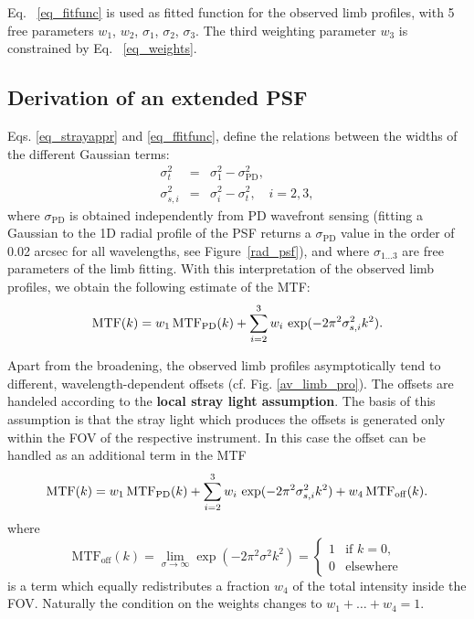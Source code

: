 \documentclass[goettingen, gauss, print]{thesis}
\begin{document}
Eq.~ \ref{eq_fitfunc} is used as fitted function for the observed limb profiles, with 5 free parameters $w_{1}$, $w_{2}$, $\sigma_{1}$, $\sigma_{2}$, $\sigma_{3}$. The third weighting parameter $w_3$ is constrained by Eq.~ \ref{eq_weights}. 

\subsection{Derivation of an extended PSF}

Eqs. \ref{eq_strayappr} and \ref{eq_ffitfunc}, define the relations between the widths of the different Gaussian terms:
\begin{eqnarray}
\sigma_{t}^{2} & = & \sigma_{1}^{2} - \sigma_{\mathrm{PD}}^2 \nonumber, \\
\sigma_{s,i}^{2} & = & \sigma_{i}^{2} - \sigma_{t}^{2}, \quad i=2,3,
\label{sigmas}
\end{eqnarray} 
where $\sigma_{\mathrm{PD}}$ is obtained independently from PD wavefront sensing (fitting a Gaussian to the 1D radial profile of the PSF returns a $\sigma_{\mathrm{PD}}$ value in the order of 0.02 arcsec for all wavelengths, see Figure~\ref{rad_psf}), and where $\sigma_{1\ldots3}$ are free parameters of the limb fitting. %
With this interpretation of the observed limb profiles, we obtain the following estimate of the MTF:
\begin{equation}
  \mathrm{MTF}(k) = w_{1} \, \mathrm{MTF}_{\mathrm{PD}}(k) + \sum_{i=2}^{3} w_{i} \, \exp(-2 \pi^2
  \sigma_{s,i}^2 k^2).
  \label{eq_mtf_stray}
\end{equation}

Apart from the broadening, the observed limb profiles asymptotically tend to different, wavelength-dependent offsets (cf. Fig. \ref{av_limb_pro}). The offsets are handeled according to the \textbf{local stray light assumption}. 
The basis of this assumption is that the stray light which produces the offsets is generated only within the FOV of the respective instrument. In this case the offset can be handled as an additional term in the MTF
\begin{equation}
  \mathrm{MTF}(k) = w_{1} \, \mathrm{MTF}_{\mathrm{PD}}(k) + \sum_{i=2}^{3} w_{i} \, \exp(-2 \pi^2
  \sigma_{s,i}^2 k^2) + w_{4} \, \mathrm{MTF}_{\mathrm{off}}(k).
\end{equation}  
where 
\begin{equation}
  \mathrm{MTF}_{\mathrm{off}}(k) = \lim_{\sigma \to \infty} \exp(-2 \pi^2
  \sigma^2 k^2) = \left\{
  \begin{array}{rl}
    1 & \textrm{if } k = 0,\\
    0 & \textrm{elsewhere}
  \end{array} \right.
\end{equation}
is a term which equally redistributes a fraction $w_4$ of the total intensity inside the FOV. Naturally the condition on the weights changes to $w_1 + \ldots + w_4 = 1$.\\
\end{document}
